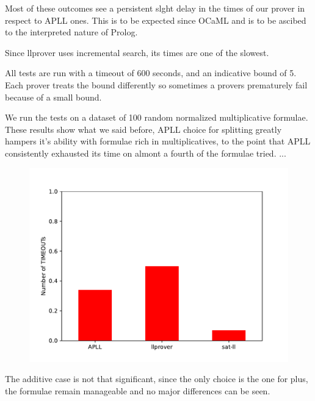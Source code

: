 \documentclass[a4paper, 12pt, tesi, english]{report}
\begin{document}
Most of these outcomes see a persistent slght delay in the times of our prover in respect to APLL ones.
This is to be expected since OCaML and is to be ascibed to the interpreted nature of Prolog.

Since llprover uses incremental search, its times are one of the slowest.

All tests are run with a timeout of 600 seconds, and an indicative bound of 5.
Each prover treats the bound differently so sometimes a provers prematurely fail because of a small bound. 

We run the tests on a dataset of 100 random normalized multiplicative formulae.
These results show what we said before, APLL choice for splitting greatly hampers it's ability with formulae rich in multiplicatives, to the point that APLL consistently exhausted its time on almont a fourth of the formulae tried.
...
\begin{figure}[h!]
	\centering
	\includegraphics{./images/mll.pdf}
\end{figure}

The additive case is not that significant, since the only choice is the one for plus, the formulae remain manageable and no major differences can be seen.
\end{document}
